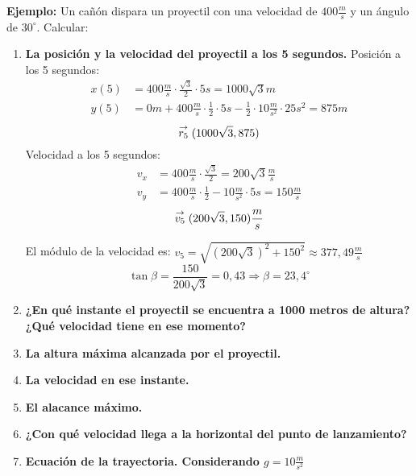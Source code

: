 \textbf{Ejemplo:} Un cañón dispara un proyectil con una velocidad de $400 \frac{m}{s}$ y un ángulo de $30^\circ$. Calcular:
\begin{enumerate}
    \item \textbf{La posición y la velocidad del proyectil a los 5 segundos.}
    Posición a los 5 segundos:
    \begin{align*}
        x(5) &= 400\frac{m}{s} \cdot \frac{\sqrt{3}}{2} \cdot 5s = 1000\sqrt{3} m\\
        y(5) &= 0m + 400\frac{m}{s} \cdot \frac{1}{2} \cdot 5s - \frac{1}{2} \cdot 10\frac{m}{s^2} \cdot 25s^2 = 875m
    \end{align*}
    $$\stackrel{\to}{r_5}(1000\sqrt{3},875)$$
    Velocidad a los 5 segundos:
    \begin{align*}
        v_x &= 400\frac{m}{s} \cdot \frac{\sqrt{3}}{2} = 200\sqrt{3}\frac{m}{s}\\
        v_y &= 400\frac{m}{s} \cdot \frac{1}{2} - 10\frac{m}{s^2} \cdot 5s = 150\frac{m}{s}
    \end{align*}
    $$\stackrel{\to}{v_5}(200\sqrt{3},150)\frac{m}{s}$$

    El módulo de la velocidad es: $v_5 = \sqrt{(200\sqrt{3})^2 + 150^2} \approx 377,49 \frac{m}{s}$
    $$\tan \beta = \frac{150}{200\sqrt{3}} = 0,43 \Rightarrow \beta = 23,4 ^\circ$$


    \item \textbf{¿En qué instante el proyectil se encuentra a 1000 metros de altura? ¿Qué velocidad tiene en ese momento?}

    \item \textbf{La altura máxima alcanzada por el proyectil.}
    \item \textbf{La velocidad en ese instante.}
    \item \textbf{El alacance máximo.}
    \item \textbf{¿Con qué velocidad llega a la horizontal del punto de lanzamiento?}
    \item \textbf{Ecuación de la trayectoria. Considerando $g = 10\frac{m}{s^2}$}
\end{enumerate}